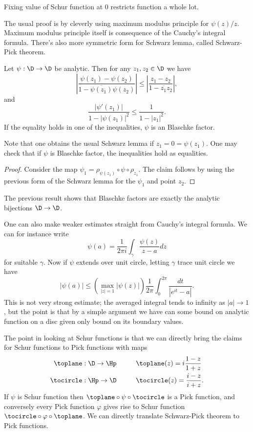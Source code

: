 Fixing value of Schur function at $0$ restricts function a whole lot.

The usual proof is by cleverly using maximum modulus principle for $\psi(z)/z$. Maximum modulus principle itself is consequence of the Cauchy's integral formula. There's also more symmetric form for Schwarz lemma, called Schwarz-Pick theorem.

\begin{lause}
	Let $\psi : \D \to \D$ be analytic. Then for any $z_{1}, z_{2} \in \D$ we have
	\[
		\left|\frac{\psi(z_{1}) - \psi(z_{2})}{1 - \overline{\psi(z_{1})} \psi(z_{2})} \right| \leq \left|\frac{z_{1} - z_{2}}{1 - \overline{z_{1}}z_{2}}\right|,
	\]
	and
	\[
		\frac{\left|\psi'(z_{1})\right|}{1 - |\psi(z_{1})|^2} \leq \frac{1}{1 - |z_{1}|^2}.
	\]
	If the equality holds in one of the inequalities, $\psi$ is an Blaschke factor.
\end{lause}

Note that one obtains the usual Schwarz lemma if $z_{1} = 0 = \psi(z_{1})$. One may check that if $\psi$ is Blaschke factor, the inequalities hold as equalities.
\begin{proof}
	Consider the map $\psi_{1} = \rho_{\psi(z_{1})} \circ \psi \circ \rho_{z_{1}}$. The claim follows by using the previous form of the Schwarz lemma for the $\psi_{1}$ and point $z_{2}$.
\end{proof}

The previous result shows that Blaschke factors are exactly the analytic bijections $\D \to \D$.

One can also make weaker estimates straight from Cauchy's integral formula. We can for instance write
\[
	\psi(a) = \frac{1}{2 \pi i}\int_{\gamma} \frac{\psi(z)}{z - a} dz
\]
for suitable $\gamma$. Now if $\psi$ extends over unit circle, letting $\gamma$ trace unit circle we have
\[
	|\psi(a)| \leq \left(\max_{|z| = 1} \left|\psi(z)\right| \right) \frac{1}{2 \pi}\int_{0}^{2 \pi} \frac{d t}{|e^{i t}  - a|}.
\]
This is not very strong estimate; the averaged integral tends to infinity as $|a| \to 1$, but the point is that by a simple argument we have can some bound on analytic function on a disc given only bound on its boundary values.

The point in looking at Schur functions is that we can directly bring the claims for Schur functions to Pick functions with maps
\begin{align*}
	\toplane : \D \to \Hp & \hspace{1cm} \toplane (z) = i \frac{1 - z}{1 + z} \\
	\tocircle : \Hp \to \D & \hspace{1cm} \tocircle (z) = \frac{i - z}{i + z}.
\end{align*}
If $\psi$ is Schur function then $\toplane \circ \psi \circ \tocircle$ is a Pick function, and conversely every Pick function $\varphi$ gives rise to Schur function $\tocircle \circ \varphi \circ \toplane$. We can directly translate Schwarz-Pick theorem to Pick functions.

